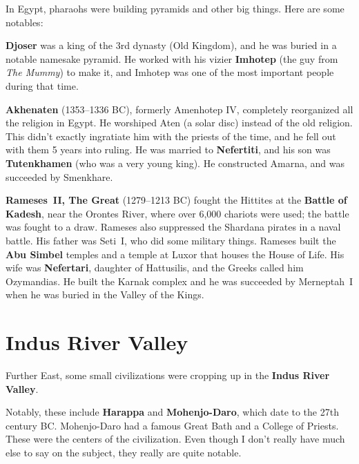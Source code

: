 In Egypt, pharaohs were building pyramids and other big things. Here are some notables:

\textbf{Djoser} was a king of the 3rd dynasty (Old Kingdom), and he was buried in a notable namesake pyramid.
He worked with his vizier \textbf{Imhotep} (the guy from \textit{The Mummy})
to make it, and Imhotep was one of the most important people during that time.

\textbf{Akhenaten} (1353--1336 BC), formerly Amenhotep IV, completely reorganized all the religion in Egypt.
He worshiped Aten (a solar disc) instead of the old religion.
This didn't exactly ingratiate him with the priests of the time, and he fell out with them 5 years into ruling.
He was married to \textbf{Nefertiti}, and his son was \textbf{Tutenkhamen} (who was a very young king).
He constructed Amarna, and was succeeded by Smenkhare.

\textbf{Rameses~II, The Great} (1279--1213 BC) fought the Hittites at the \textbf{Battle of Kadesh},
near the Orontes River, where over 6,000 chariots were used;
the battle was fought to a draw.
Rameses also suppressed the Shardana pirates in a naval battle.
His father was Seti~I, who did some military things.
Rameses built the \textbf{Abu Simbel} temples and a temple at Luxor that houses the House of Life.
His wife was \textbf{Nefertari}, daughter of Hattusilis, and the Greeks called him Ozymandias.
He built the Karnak complex and he was succeeded by Merneptah~I when he was buried in the Valley of the Kings.

\section{Indus River Valley}

Further East, some small civilizations were cropping up in the \textbf{Indus River Valley}.

Notably, these include \textbf{Harappa} and \textbf{Mohenjo-Daro}, which date to the 27th century BC\@.
Mohenjo-Daro had a famous Great Bath and a College of Priests.
These were the centers of the civilization.
Even though I don't really have much else to say on the subject, they really are quite notable.
